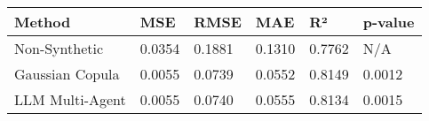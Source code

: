 \begin{tabular}{llllll}
\toprule
Method & MSE & RMSE & MAE & R² & p-value \\
\midrule
Non-Synthetic & 0.0354 & 0.1881 & 0.1310 & 0.7762 & N/A \\
Gaussian Copula & 0.0055 & 0.0739 & 0.0552 & 0.8149 & 0.0012 \\
LLM Multi-Agent & 0.0055 & 0.0740 & 0.0555 & 0.8134 & 0.0015 \\
\bottomrule
\end{tabular}
